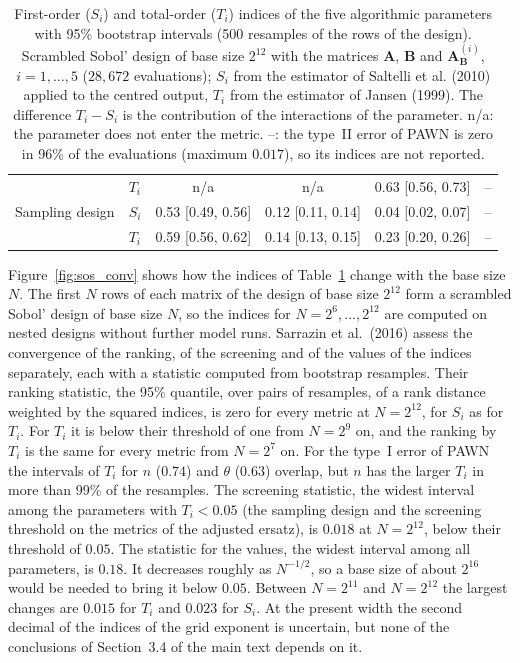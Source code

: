 \documentclass[11pt,a4paper]{article}
\begin{document}
\begin{table}[H]
\begin{tabular}{@{}llcccc@{}}
 & $T_i$ & n/a & n/a & 0.63 {\scriptsize[0.56, 0.73]} & --\\
Sampling design & $S_i$ & 0.53 {\scriptsize[0.49, 0.56]} & 0.12 {\scriptsize[0.11, 0.14]} & 0.04 {\scriptsize[0.02, 0.07]} & --\\
 & $T_i$ & 0.59 {\scriptsize[0.56, 0.62]} & 0.14 {\scriptsize[0.13, 0.15]} & 0.23 {\scriptsize[0.20, 0.26]} & --\\
\bottomrule\end{tabular}
\caption{First-order ($S_i$) and total-order ($T_i$) indices of the five algorithmic parameters with 95\% bootstrap intervals (500 resamples of the rows of the design). Scrambled Sobol' design of base size $2^{12}$ with the matrices $\mathbf A$, $\mathbf B$ and $\mathbf A_{\mathbf B}^{(i)}$, $i=1,\dots,5$ ($28{,}672$ evaluations); $S_i$ from the estimator of Saltelli et al. (2010) applied to the centred output, $T_i$ from the estimator of Jansen (1999). The difference $T_i-S_i$ is the contribution of the interactions of the parameter. n/a: the parameter does not enter the metric. --: the type~II error of PAWN is zero in 96\% of the evaluations (maximum $0.017$), so its indices are not reported.}
\label{tab:sos}
\end{table}

Figure~\ref{fig:sos_conv} shows how the indices of Table~\ref{tab:sos} change with the base size $N$. The first $N$ rows of each matrix of the design of base size $2^{12}$ form a scrambled Sobol' design of base size $N$, so the indices for $N=2^6,\dots,2^{12}$ are computed on nested designs without further model runs. Sarrazin et al.\ (2016) assess the convergence of the ranking, of the screening and of the values of the indices separately, each with a statistic computed from bootstrap resamples. Their ranking statistic, the 95\% quantile, over pairs of resamples, of a rank distance weighted by the squared indices, is zero for every metric at $N=2^{12}$, for $S_i$ as for $T_i$. For $T_i$ it is below their threshold of one from $N=2^9$ on, and the ranking by $T_i$ is the same for every metric from $N=2^7$ on. For the type~I error of PAWN the intervals of $T_i$ for $n$ ($0.74$) and $\theta$ ($0.63$) overlap, but $n$ has the larger $T_i$ in more than 99\% of the resamples. The screening statistic, the widest interval among the parameters with $T_i<0.05$ (the sampling design and the screening threshold on the metrics of the adjusted ersatz), is $0.018$ at $N=2^{12}$, below their threshold of $0.05$. The statistic for the values, the widest interval among all parameters, is $0.18$. It decreases roughly as $N^{-1/2}$, so a base size of about $2^{16}$ would be needed to bring it below $0.05$. Between $N=2^{11}$ and $N=2^{12}$ the largest changes are $0.015$ for $T_i$ and $0.023$ for $S_i$. At the present width the second decimal of the indices of the grid exponent is uncertain, but none of the conclusions of Section~3.4 of the main text depends on it.
\end{document}
